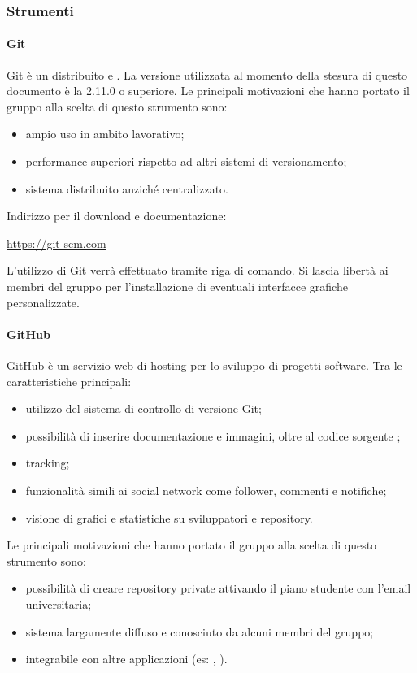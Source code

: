 	  \subsubsection{Strumenti}
	  \paragraph{Git}
	  Git è un  distribuito e . La versione utilizzata al momento della stesura di questo documento è la 2.11.0 o superiore.
	  Le principali motivazioni che hanno portato il gruppo alla scelta di questo strumento sono:
	  \begin{itemize}
	  	\item ampio uso in ambito lavorativo;
	  	\item performance superiori rispetto ad altri sistemi di versionamento;
	  	\item sistema distribuito anziché centralizzato.
	  \end{itemize}
	  Indirizzo per il download e documentazione:
	  \begin{center}
	  	\url{https://git-scm.com}
	  \end{center}
	  L'utilizzo di Git verrà effettuato tramite riga di comando. Si lascia libertà ai membri del gruppo per l'installazione di eventuali interfacce grafiche personalizzate.
	  \paragraph{GitHub}
	  GitHub è un servizio web di hosting per lo sviluppo di progetti software. Tra le caratteristiche principali:
	  \begin{itemize}
	  	\item utilizzo del sistema di controllo di versione Git;
	  	\item possibilità di inserire documentazione e immagini, oltre al codice sorgente ;
	  	\item {} tracking;
	  	\item funzionalità simili ai social network come follower, commenti e notifiche;
	  	\item visione di grafici e statistiche su sviluppatori e repository.
	  \end{itemize}
	  Le principali motivazioni che hanno portato il gruppo alla scelta di questo strumento sono:
	  \begin{itemize}
	  	\item possibilità di creare repository private attivando il piano studente con l'email universitaria;
	  	\item sistema largamente diffuso e conosciuto da alcuni membri del gruppo;
	  	\item integrabile con altre applicazioni (es: , ).
	  \end{itemize}
  
